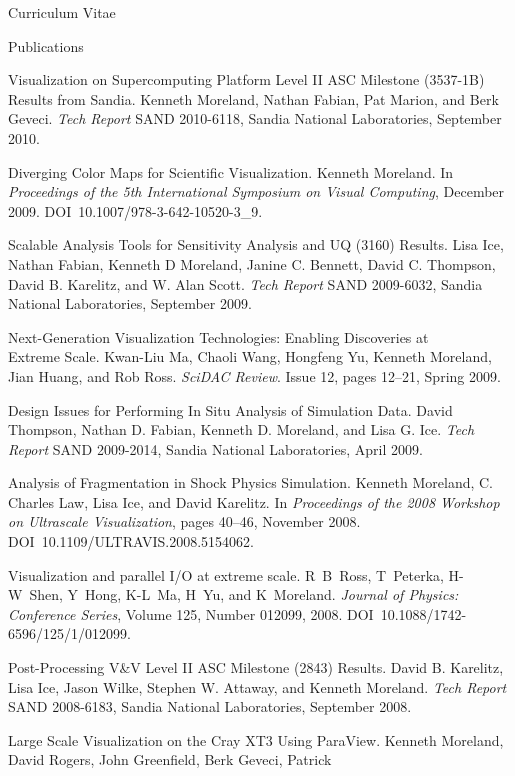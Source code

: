 \documentclass{article}
\begin{document}
\begin{cv}{Curriculum Vitae}
\begin{cvlist}{Publications}
    \item[Visualization on Supercomputing Platform Level II ASC Milestone]
      (3537-1B) Results from Sandia. Kenneth Moreland, Nathan Fabian, Pat
      Marion, and Berk Geveci. \emph{Tech Report} SAND 2010-6118, Sandia
      National Laboratories, September 2010.
    \item[Diverging Color Maps for Scientific Visualization.] Kenneth
      Moreland. In \emph{Proceedings of the 5th International Symposium on
        Visual Computing}, December 2009. DOI~10.1007/978-3-642-10520-3\_9.
    \item[Scalable Analysis Tools for Sensitivity Analysis and UQ (3160)
      Results.] Lisa Ice, Nathan Fabian, Kenneth D Moreland, Janine
      C. Bennett, David C. Thompson, David B. Karelitz, and W. Alan
      Scott. \emph{Tech Report} SAND 2009-6032, Sandia National
      Laboratories, September 2009.
    \item[Next-Generation Visualization Technologies: Enabling Discoveries
      at]~\\ Extreme Scale. Kwan-Liu Ma, Chaoli Wang, Hongfeng Yu, Kenneth
      Moreland, Jian Huang, and Rob Ross. \emph{SciDAC Review}. Issue 12,
      pages 12--21, Spring 2009.
    \item[Design Issues for Performing In Situ Analysis of Simulation
      Data.] David Thompson, Nathan D. Fabian, Kenneth D. Moreland, and
      Lisa G. Ice. \emph{Tech Report} SAND 2009-2014, Sandia National
      Laboratories, April 2009.
    \item[Analysis of Fragmentation in Shock Physics Simulation.] Kenneth
      Moreland, C. Charles Law, Lisa Ice, and David Karelitz. In
      \emph{Proceedings of the 2008 Workshop on Ultrascale Visualization},
      pages 40--46, November 2008. DOI~10.1109/ULTRAVIS.2008.5154062.
    \item[Visualization and parallel I/O at extreme scale.] R~B~Ross,
      T~Peterka, H-W~Shen, Y~Hong, K-L~Ma, H~Yu, and
      K~Moreland. \emph{Journal of Physics: Conference Series}, Volume 125,
      Number 012099, 2008. DOI~10.1088/1742-6596/125/1/012099.
    \item[Post-Processing V\&V Level II ASC Milestone (2843) Results.] David
      B. Karelitz, Lisa Ice, Jason Wilke, Stephen W. Attaway, and Kenneth
      Moreland. \emph{Tech Report} SAND 2008-6183, Sandia National
      Laboratories, September 2008.
    \item[Large Scale Visualization on the Cray XT3 Using ParaView.]
      Kenneth Moreland, David Rogers, John Greenfield, Berk Geveci, Patrick

\end{cvlist}
\end{cv}
\end{document}

